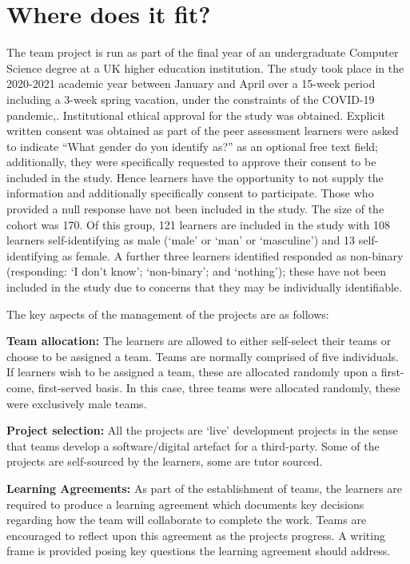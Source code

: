 \documentclass[sigconf, anonymous=false]{acmart}
\begin{document}
\section{Where does it fit?}
The team project is run as part of the final year of an undergraduate
Computer Science degree at a UK higher education institution. The
study took place in the 2020-2021 academic year between January
and April over a 15-week period including a 3-week spring
vacation, under the constraints of the COVID-19 pandemic,. Institutional ethical approval for the study was obtained. Explicit written consent was obtained as part of the peer assessment learners were asked to indicate ``What gender do you
identify as?'' as an optional free text field; additionally, they were
specifically requested to approve their consent to be included in the
study. Hence learners have the opportunity to not supply the
information and additionally specifically consent to
participate. Those who provided a null response have not been included
in the study. The size of the cohort was 170. Of this group, 121
learners are included in the study with 108 learners self-identifying
as male (`male' or `man' or `masculine') and 13 self-identifying as
female. A further three learners identified responded as non-binary
(responding: `I don't know'; `non-binary'; and `nothing'); these have
not been included in the study due to concerns that they may be
individually identifiable.

The key aspects of the management of the projects are as
follows:

\textbf{Team allocation:}
The learners are allowed to either self-select their teams or choose
to be assigned a team. Teams are normally comprised of five
individuals. If learners wish to be assigned a team, these are
allocated randomly upon a first-come, first-served basis. In this case, three teams were allocated randomly, these were exclusively male teams.

\textbf {Project selection:}
All the projects are `live' development projects in the sense that
teams develop a software/digital artefact for a third-party. Some of the
projects are self-sourced by the learners, some are tutor sourced.

\textbf{Learning Agreements:}
As part of the establishment of teams, the learners are required to
produce a learning agreement which documents key decisions regarding
how the team will collaborate to complete the work. Teams are
encouraged to reflect upon this agreement as the projects progress. A
writing frame is provided posing key questions the learning agreement
should address.
\end{document}
